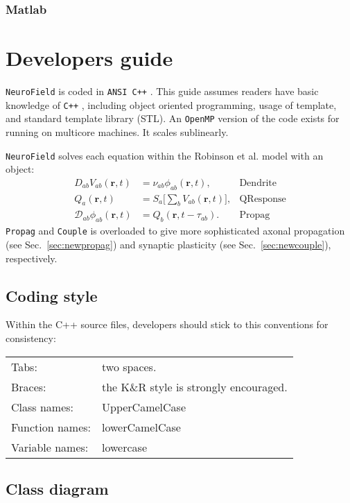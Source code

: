 \documentclass[12pt,a4paper]{article}
\newcommand{\type}[1]{ {\small\small\tt #1} }
\begin{document}
\subsubsection{Matlab}

\pagebreak
\section{Developers guide}

\type{NeuroField} is coded in \type{ANSI C++}. This guide assumes readers have basic knowledge of \type{C++}, including object oriented programming, usage of template, and standard template library (STL). An \type{OpenMP} version of the code exists for running on multicore machines. It scales sublinearly.

\type{NeuroField} solves each equation within the Robinson et al. model with an object:
\begin{align*}
	D_{ab}V_{ab}(\mathbf{r},t) &= \nu_{ab}\phi_{ab}(\mathbf{r},t), & \mathrm{Dendrite}\\
					  Q_a(\mathbf{r},t) &= S_a \big[\sum_b V_{ab}(\mathbf{r},t) \big], & \mathrm{QResponse}\\
	\mathcal{D}_{ab}\phi_{ab}(\mathbf{r},t) &= Q_b(\mathbf{r},t-\tau_{ab}).&  \mathrm{Propag}
\end{align*}
\type{Propag} and \type{Couple} is overloaded to give more sophisticated axonal propagation (see Sec.~\ref{sec:newpropag}) and synaptic plasticity (see Sec.~\ref{sec:newcouple}), respectively.

\subsection{Coding style}

Within the C++ source files, developers should stick to this conventions for consistency:

\begin{tabular}{ l l }
	Tabs:& two spaces.\\
	Braces:& the K\&R style is strongly encouraged.\\
	Class names:&UpperCamelCase\\
	Function names:&lowerCamelCase\\
	Variable names:&lowercase
\end{tabular}

\subsection{Class diagram}
\end{document}
